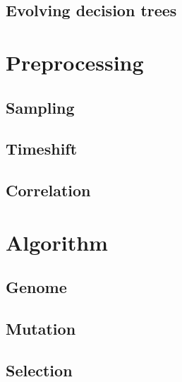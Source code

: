 \documentclass[conference]{IEEEtran}
\begin{document}
\subsection{Evolving decision trees}

\section{Preprocessing}

\subsection{Sampling}

\subsection{Timeshift}

\subsection{Correlation}


\section{Algorithm}
%

\subsection{Genome}


\subsection{Mutation}

\subsection{Selection}
\end{document}
